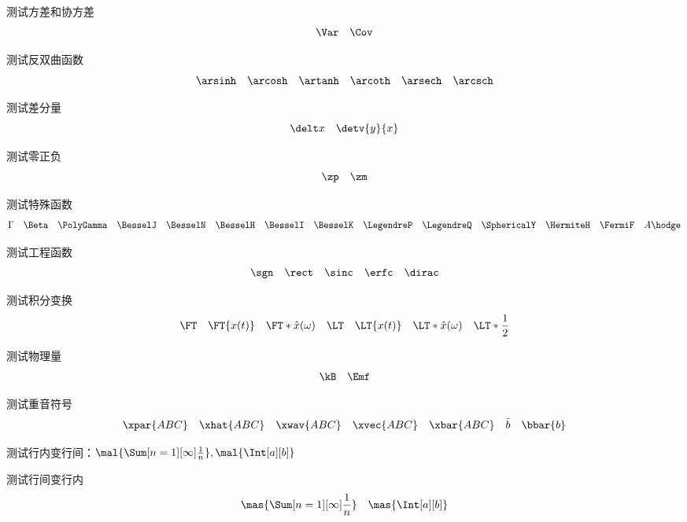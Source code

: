 测试方差和协方差
\begin{equation}
    \Var\quad
    \Cov
\end{equation}

测试反双曲函数
\begin{equation}
    \arsinh\quad
    \arcosh\quad
    \artanh\quad
    \arcoth\quad
    \arsech\quad
    \arcsch
\end{equation}

测试差分量
\begin{equation}
    \delt x\quad
    \detv{y}{x}
\end{equation}

测试零正负
\begin{equation}
    \zp\quad
    \zm
\end{equation}

测试特殊函数
\begin{equation}
    \Gamma\quad
    \Beta\quad
    \PolyGamma\quad
    \BesselJ\quad
    \BesselN\quad
    \BesselH\quad
    \BesselI\quad
    \BesselK\quad
    \LegendreP\quad
    \LegendreQ\quad
    \SphericalY\quad
    \HermiteH\quad
    \FermiF\quad
    A\hodge
\end{equation}

测试工程函数
\begin{equation}
    \sgn\quad
    \rect\quad
    \sinc\quad
    \erfc\quad
    \dirac
\end{equation}

测试积分变换
\begin{equation}
    \FT\quad
    \FT{x(t)}\quad
    \FT*{\hat{x}(\omega)}\quad
    \LT\quad
    \LT{x(t)}\quad
    \LT*{\hat{x}(\omega)}\quad
    \LT*{\frac{1}{2}}
\end{equation}

测试物理量
\begin{equation}
    \kB\quad
    \Emf
\end{equation}

测试重音符号
\begin{equation}
    \xpar{ABC}\quad
    \xhat{ABC}\quad
    \xwav{ABC}\quad
    \xvec{ABC}\quad
    \xbar{ABC}\quad
    \bar{b}\quad
    \bbar{b}
\end{equation}

测试行内变行间：$\mal{\Sum[n=1][\infty]\frac{1}{n}}, \mal{\Int[a][b]}$

测试行间变行内
\begin{equation}
    \mas{\Sum[n=1][\infty]\frac{1}{n}}\quad
    \mas{\Int[a][b]}
\end{equation}

